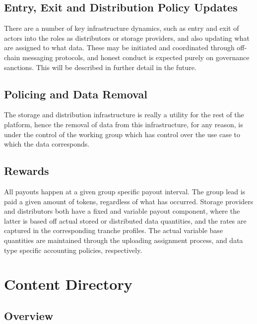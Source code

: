 \documentclass{article}
\begin{document}
\subsection{Entry, Exit and Distribution Policy Updates}

There are a number of key infrastructure dynamics, such as entry and exit of actors into the roles as distributors or storage providers, and also updating what are assigned to what data. These may be initiated and coordinated through off-chain messaging protocols, and honest conduct is expected purely on governance sanctions. This will be described in further detail in the future.

\subsection{Policing and Data Removal}

The storage and distribution infrastructure is really a utility for the rest of the platform, hence the removal of data from this infrastructure, for any reason, is under the control of the working group which has control over the use case to which the data corresponds.

\subsection{Rewards}

All payouts happen at a given group specific payout interval.
The group lead is paid a given amount of tokens, regardless of what has occurred. Storage providers and distributors both have a fixed and variable payout component, where the latter is based off actual stored or distributed data quantities, and the rates are captured in the corresponding tranche profiles. The actual variable base quantities are maintained through the uploading assignment process, and data type specific accounting policies, respectively.


\section{Content Directory} \label{sec:content_directory}

\subsection{Overview}
\end{document}
